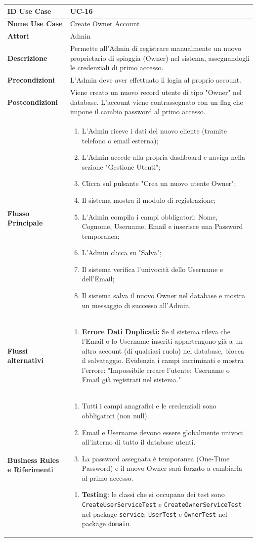 \documentclass{article}
\newcommand{\usecasetable}[9]{
	\begin{table}[h!]
		\centering
		\footnotesize
		\renewcommand{\arraystretch}{1.4}
		\begin{tabularx}{\textwidth}{|l|>{\raggedright\arraybackslash}X|}
			\hline
			\textbf{ID Use Case} & #1 \\ \hline
			\textbf{Nome Use Case} & #2 \\ \hline
			\textbf{Attori} & #3 \\ \hline
			\textbf{Descrizione} & #4 \\ \hline
			\textbf{Precondizioni} & #5 \\ \hline
			\textbf{Postcondizioni} & #6 \\ \hline
			\textbf{Flusso Principale} & #7 \\ \hline
			\textbf{Flussi alternativi} & #8 \\ \hline
			\textbf{Business Rules e Riferimenti} & #9 \\ \hline
		\end{tabularx}
	\end{table}
}
\begin{document}
	\newpage
	
	\usecasetable
	{UC-16}
	{Create Owner Account}
	{Admin}
	{Permette all'Admin di registrare manualmente un nuovo proprietario di spiaggia (Owner) nel sistema, assegnandogli le credenziali di primo accesso.}
	{L'Admin deve aver effettuato il login al proprio account.}
	{Viene creato un nuovo record utente di tipo "Owner" nel database. L'account viene contrassegnato con un flag che impone il cambio password al primo accesso.}
	{
		\begin{enumerate}[nosep, leftmargin=*]
			\item L'Admin riceve i dati del nuovo cliente (tramite telefono o email esterna);
			\item L'Admin accede alla propria dashboard e naviga nella sezione "Gestione Utenti";
			\item Clicca sul pulsante "Crea un nuovo utente Owner";
			\item Il sistema mostra il modulo di registrazione;
			\item L'Admin compila i campi obbligatori: Nome, Cognome, Username, Email e inserisce una Password temporanea;
			\item L'Admin clicca su "Salva";
			\item Il sistema verifica l'univocità dello Username e dell'Email;
			\item Il sistema salva il nuovo Owner nel database e mostra un messaggio di successo all'Admin.
		\end{enumerate}
	}
	{
		\begin{enumerate}[nosep, leftmargin=25px]
			\item[\textbf{7a-e.}] \textbf{Errore Dati Duplicati:} Se il sistema rileva che l'Email o lo Username inseriti appartengono già a un altro account (di qualsiasi ruolo) nel database, blocca il salvataggio. Evidenzia i campi incriminati e mostra l'errore: "Impossibile creare l'utente: Username o Email già registrati nel sistema."
		\end{enumerate}
	}
	{
		\begin{enumerate}[nosep, leftmargin=*]
			\item[•] Tutti i campi anagrafici e le credenziali sono obbligatori (non null).
			\item[•] Email e Username devono essere globalmente univoci all'interno di tutto il database utenti.
			\item[•] La password assegnata è temporanea (One-Time Password) e il nuovo Owner sarà forzato a cambiarla al primo accesso.
		\end{enumerate}
		
		\begin{enumerate}[leftmargin=*]
			\item[•] \textbf{Testing}: le classi che si occupano dei test sono \texttt{CreateUserServiceTest} e \texttt{CreateOwnerServiceTest} nel package \texttt{service}; \texttt{UserTest} e \texttt{OwnerTest} nel package \texttt{domain}.
		\end{enumerate}
	}
		
\end{document}
